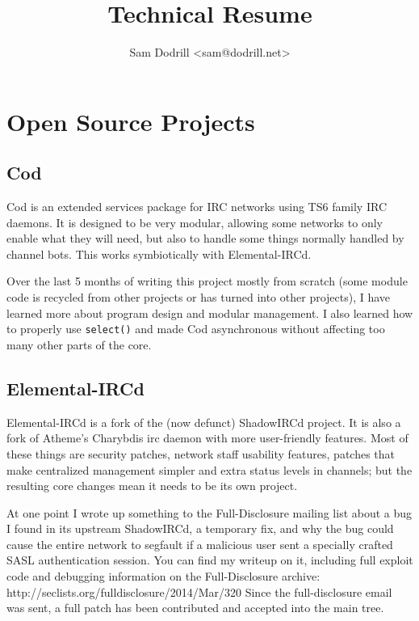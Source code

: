 \documentclass[twocolumn]{article}
\title{Technical Resume}
\author{Sam Dodrill \textless{}sam@dodrill.net\textgreater{}}
\date{}
\begin{document}
\twocolumn[
 \begin{@twocolumnfalse}
  \maketitle
   \end{@twocolumnfalse}
]

\section{Open Source Projects}

\subsection{Cod}

Cod is an extended services package for IRC networks using TS6 family IRC daemons. It is designed to be very modular, allowing some networks to only enable what they will need, but also to handle some things normally handled by channel bots. This works symbiotically with Elemental-IRCd.

Over the last 5 months of writing this project mostly from scratch (some module code is recycled from other projects or has turned into other projects), I have learned more about program design and modular management. I also learned how to properly use \texttt{select()} and made Cod asynchronous without affecting too many other parts of the core.

\subsection{Elemental-IRCd}

Elemental-IRCd is a fork of the (now defunct) ShadowIRCd project. It is also a fork of Atheme's Charybdis irc daemon with more user-friendly features. Most of these things are security patches, network staff usability features, patches that make centralized management simpler and extra status levels in channels; but the resulting core changes mean it needs to be its own project.

At one point I wrote up something to the Full-Disclosure mailing list about a bug I found in its upstream ShadowIRCd, a temporary fix, and why the bug could cause the entire network to segfault if a malicious user sent a specially crafted SASL authentication session. You can find my writeup on it, including full exploit code and debugging information on the Full-Disclosure archive: http://seclists.org/fulldisclosure/2014/Mar/320 Since the full-disclosure email was sent, a full patch has been contributed and accepted into the main tree.
\end{document}
